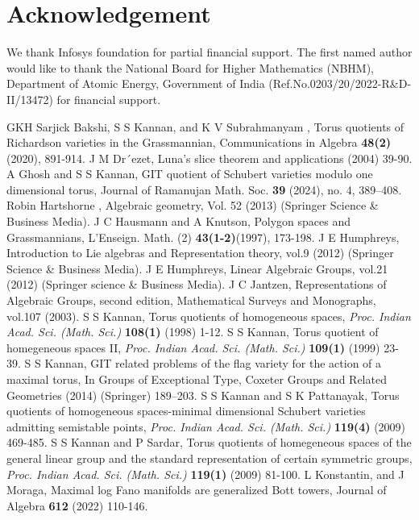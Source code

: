 \documentclass[12pt,reqno]{amsart}
\numberwithin{equation}{section}
\theoremstyle{definition}
\begin{document}
\section{Acknowledgement}We thank Infosys foundation for partial financial support. The first named author would like to thank
the National Board for Higher Mathematics (NBHM), Department of
Atomic Energy, Government of India (Ref.No.0203/20/2022-R\&D-II/13472) for financial support.
\begin{thebibliography}{GKH}
		Sarjick Bakshi, S S Kannan, and K V Subrahmanyam , Torus quotients of Richardson varieties in the Grassmannian, Communications in Algebra {\bf48(2)} (2020), 891-914.
	J M Dr´ezet, Luna's slice theorem and applications (2004) 39-90.
	 A Ghosh and S S Kannan, {GIT quotient of Schubert varieties modulo one dimensional torus}, 
	Journal of Ramanujan Math. Soc. {\bf39} (2024), no. 4, 389–408.
	Robin Hartshorne , Algebraic geometry, Vol. 52 (2013) (Springer Science \& Business Media).
	J C Hausmann and A Knutson, Polygon spaces and Grassmannians, L'Enseign. Math. (2) {\bf 43(1-2)}(1997), 173-198.
	 J E Humphreys, {Introduction to Lie algebras and Representation theory}, vol.9 (2012) (Springer Science \& Business Media).
	 J E Humphreys, {Linear Algebraic Groups}, vol.21 (2012) (Springer science \& Business Media).
	 J C Jantzen, {Representations of Algebraic Groups,} second edition, Mathematical Surveys and Monographs, vol.107 (2003).
	  S S Kannan, {Torus quotients of homogeneous spaces,} {\em Proc. Indian Acad. Sci. (Math. Sci.)} {\bf 108(1)} (1998) 1-12.
	  S S Kannan, {Torus quotient of homegeneous spaces II,} {\em Proc. Indian Acad. Sci. (Math. Sci.)} {\bf 109(1)} (1999) 23-39.
	 S S Kannan, GIT related problems of the flag variety for the action
	of a maximal torus, In Groups of Exceptional Type, Coxeter Groups and Related
	Geometries (2014) (Springer) 189–203.
	 S S Kannan and S K Pattanayak, {Torus quotients of homogeneous spaces-minimal dimensional Schubert varieties admitting semistable points,} {\em Proc. Indian Acad. Sci. (Math. Sci.)} {\bf 119(4)} (2009) 469-485.
	 S S Kannan and P Sardar, {Torus quotients of homegeneous spaces of the general linear group and the standard representation of certain symmetric groups,} {\em Proc. Indian Acad. Sci. (Math. Sci.)} {\bf 119(1)} (2009) 81-100.
	L Konstantin, and J Moraga, Maximal log Fano manifolds are generalized Bott towers, Journal of Algebra {\bf612} (2022) 110-146.

\end{thebibliography}
\end{document}
